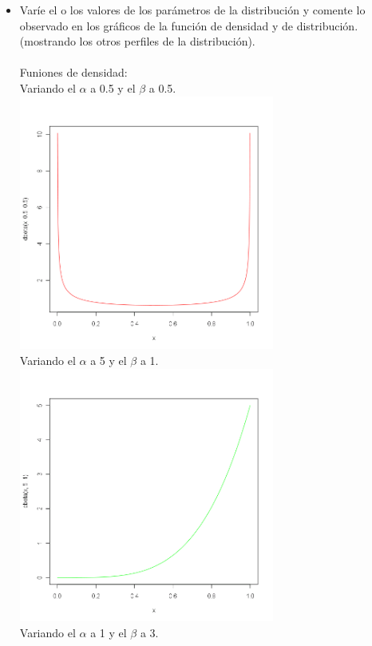 \begin{itemize}
	\item Var\'ie el o los valores de los par\'ametros de la distribuci\'on y comente lo observado en los gr\'aficos de la funci\'on
	 de densidad y de distribuci\'on. (mostrando los otros perfiles de la distribuci\'on).\\\\
	Funiones de densidad:\\
	Variando el $\alpha$ a 0.5 y el $\beta$ a 0.5.\\
  	  \includegraphics[width=3.3in,height=3.3in]{images/2_4-dbeta55.png}\\
	Variando el $\alpha$ a 5 y el $\beta$ a 1.\\
  	  \includegraphics[width=3.3in,height=3.3in]{images/2_4-dbeta51.png}\\
	Variando el $\alpha$ a 1 y el $\beta$ a 3.\\

\end{itemize}
